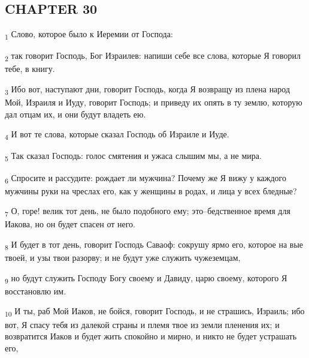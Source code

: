 \subsection{CHAPTER 30}
\begin{tcolorbox}
\textsubscript{1} Слово, которое было к Иеремии от Господа:
\end{tcolorbox}
\begin{tcolorbox}
\textsubscript{2} так говорит Господь, Бог Израилев: напиши себе все слова, которые Я говорил тебе, в книгу.
\end{tcolorbox}
\begin{tcolorbox}
\textsubscript{3} Ибо вот, наступают дни, говорит Господь, когда Я возвращу из плена народ Мой, Израиля и Иуду, говорит Господь; и приведу их опять в ту землю, которую дал отцам их, и они будут владеть ею.
\end{tcolorbox}
\begin{tcolorbox}
\textsubscript{4} И вот те слова, которые сказал Господь об Израиле и Иуде.
\end{tcolorbox}
\begin{tcolorbox}
\textsubscript{5} Так сказал Господь: голос смятения и ужаса слышим мы, а не мира.
\end{tcolorbox}
\begin{tcolorbox}
\textsubscript{6} Спросите и рассудите: рождает ли мужчина? Почему же Я вижу у каждого мужчины руки на чреслах его, как у женщины в родах, и лица у всех бледные?
\end{tcolorbox}
\begin{tcolorbox}
\textsubscript{7} О, горе! велик тот день, не было подобного ему; это--бедственное время для Иакова, но он будет спасен от него.
\end{tcolorbox}
\begin{tcolorbox}
\textsubscript{8} И будет в тот день, говорит Господь Саваоф: сокрушу ярмо его, которое на вые твоей, и узы твои разорву; и не будут уже служить чужеземцам,
\end{tcolorbox}
\begin{tcolorbox}
\textsubscript{9} но будут служить Господу Богу своему и Давиду, царю своему, которого Я восстановлю им.
\end{tcolorbox}
\begin{tcolorbox}
\textsubscript{10} И ты, раб Мой Иаков, не бойся, говорит Господь, и не страшись, Израиль; ибо вот, Я спасу тебя из далекой страны и племя твое из земли пленения их; и возвратится Иаков и будет жить спокойно и мирно, и никто не будет устрашать его,
\end{tcolorbox}
